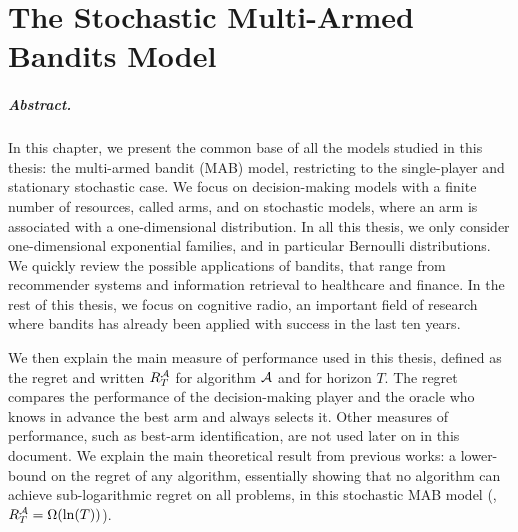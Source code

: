 
\chapter{The Stochastic Multi-Armed Bandits Model}
\label{chapter:2}
\minitoc

\newpage

\paragraph{Abstract.}
%
In this chapter, we present the common base of all the models studied in this thesis:
the multi-armed bandit (MAB) model,
restricting to the single-player and stationary stochastic case.
We focus on decision-making models with a finite number of resources, called arms, and on stochastic models, where an arm is associated with a one-dimensional distribution.
In all this thesis, we only consider one-dimensional exponential families, and in particular Bernoulli distributions.
%
We quickly review the possible applications of bandits, that range from recommender systems and information retrieval to healthcare and finance. In the rest of this thesis, we focus on cognitive radio, an important field of research where bandits has already been applied with success in the last ten years.

We then explain the main measure of performance used in this thesis, defined as the regret and written $R_T^{\mathcal{A}}$ for algorithm $\mathcal{A}$ and for horizon $T$. The regret compares the performance of the decision-making player and the oracle who knows in advance the best arm and always selects it.
Other measures of performance, such as best-arm identification, are not used later on in this document.
%
We explain the main theoretical result from previous works: a lower-bound on the regret of any algorithm, essentially showing that no algorithm can achieve sub-logarithmic regret on all problems, in this stochastic MAB model (\ie, $R_T^{\mathcal{A}} = \Omega(\ln(T))$).

